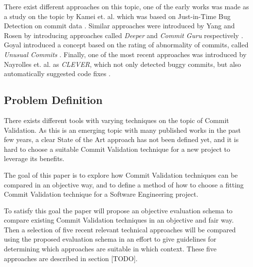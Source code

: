 There exist different approaches on this topic, one of the early works was made as a study on the topic by Kamei et. al. which was based on Just-in-Time Bug Detection on commit data \cite{Kamei2013}. Similar approaches were introduced by Yang and Rosen by introducing approaches called \textit{Deeper} and \textit{Commit Guru} respectively \cite{Yang2015,Rosen2015}. Goyal introduced a concept based on the rating of abnormality of commits, called \textit{Unusual Commits} \cite{Goyal2017}. Finally, one of the most recent approaches was introduced by Nayrolles et. al. as \textit{CLEVER}, which not only detected buggy commits, but also automatically suggested code fixes \cite{Nayrolles2018}.

\subsection{Problem Definition}


There exists different tools with varying techniques on the topic of Commit Validation. As this is an emerging topic with many published works in the past few years, a clear State of the Art approach has not been defined yet, and it is hard to choose a suitable Commit Validation technique for a new project to leverage its benefits. 

The goal of this paper is to explore how Commit Validation techniques can be compared in an objective way, and to define a method of how to choose a fitting Commit Validation technique for a Software Engineering project.

To satisfy this goal the paper will propose an objective evaluation schema to compare existing Commit Validation techniques in an objective and fair way. Then a selection of five recent relevant technical approaches will be compared using the proposed evaluation schema in an effort to give guidelines for determining which approaches are suitable in which context. These five approaches are described in section [TODO].

